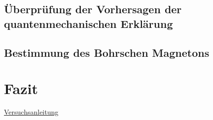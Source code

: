 \documentclass[bigchapter,colorback,accentcolor=tud4b,linedtoc,11pt]{tudreport}
\begin{document}
\section{Überprüfung der Vorhersagen der quantenmechanischen Erklärung}
\section{Bestimmung des Bohrschen Magnetons}
\chapter{Fazit}

\cleardoublepage{}
\newpage
\begin{thebibliography}{100}
   \url{Versuchsanleitung}
\end{thebibliography}
\end{document}
